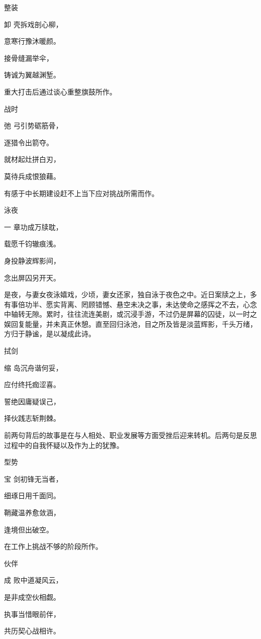 \documentclass{article}
\newenvironment{poem}[3]{
\begin{minipage}{\textwidth}
\begin{pinyinscope}\begin{center}\Large\linespread{1.4}\selectfont #2\end{center}\end{pinyinscope}
\begin{pinyinscope}
	\begin{center}
	\Large\linespread{1.4}\rmfamily\selectfont #3
}{\end{center}
\end{pinyinscope}
\end{minipage}
}
\begin{document}
\begin{poem}{}{整装}
卸壳拆戏剖心柳，

意寒行豫沐暖颜。

接骨缝漏{}举伞，

铸诚为翼越渊堑。
\end{poem}

重大打击后通过谈心重整旗鼓所作。

\begin{poem}{}{战时}
弛弓引势砺筋骨，

逐猎令出箭夺{}。

就材起灶拼白刃，

莫待兵成恨狼藉。
\end{poem}

有感于中长期建设赶不上当下应对挑战所需而作。

\begin{poem}{}{泳夜}
一章功成万牍耽，

载愿千钧辙痕浅。

身投静波辉影间，

念出屏囚另开天。
\end{poem}

是夜，与妻女夜泳嬉戏，少顷，妻女还家，独自泳于夜色之中。近日案牍之上，多有事倍功半、愿实背离、罔顾错憾、悬空未决之事，未达使命之感挥之不去，心念中轴转无隙。累时，往往流连美剧，或沉浸手游，不过仍是屏幕的囚徒，以一时之娱回复能量，并未真正休憩。直至回归泳池，目之所及皆是淡蓝辉影，千头万绪，方归于静谧，是以凝成此诗。

\begin{poem}{}{拭剑}
缩岛沉舟谐何妥，

应付终托痂涩喜。

誓绝因庸疑误己，

择伙践志斩荆棘。
\end{poem}

前两句背后的故事是在与人相处、职业发展等方面受挫后迎来转机。后两句是反思过程中的自我怀疑以及作为上的犹豫。

\begin{poem}{}{型势}
宝剑初锋无当者，

细琢日用千面同。

鞘藏温养愈敛涵，

逢境但出破{}空。
\end{poem}

在工作上挑战不够的阶段所作。

\begin{poem}{}{伙伴}
成败中道凝风云，

是非成空伙相觑。

执事当惜眼前伴，

共历契心战相许。
\end{poem}
\end{document}
